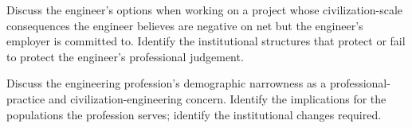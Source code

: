 \begin{exercise}
Discuss the engineer's options when working on a project whose civilization-scale consequences the engineer believes are negative on net but the engineer's employer is committed to. Identify the institutional structures that protect or fail to protect the engineer's professional judgement.
\end{exercise}

\begin{exercise}
Discuss the engineering profession's demographic narrowness as a professional-practice and civilization-engineering concern. Identify the implications for the populations the profession serves; identify the institutional changes required.
\end{exercise}
